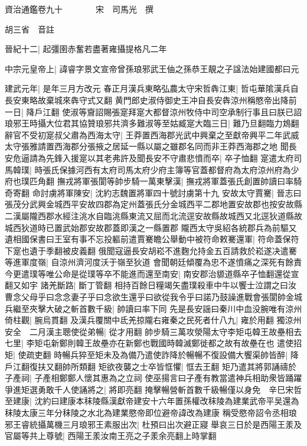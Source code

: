 資治通鑑卷九十　　　　宋　司馬光　撰

胡三省　音註

晉紀十二|{
	起彊圉赤奮若盡著雍攝提格凡二年}


中宗元皇帝上|{
	諱睿字景文宣帝曾孫琅邪武王伷之孫恭王靚之子諡法始建國都曰元}


建武元年|{
	是年三月方改元}
春正月漢兵東略弘農太守宋哲犇江東|{
	哲屯華隂漢兵自長安東略故棄城來犇守式又翻}
黄門郎史淑侍御史王冲自長安犇涼州稱愍帝出降前一日|{
	降戶江翻}
使淑等齎詔賜張寔拜寔大都督涼州牧侍中司空承制行事且曰朕已詔琅邪王時攝大位君其協贊琅邪共濟多難淑等至姑臧寔大臨三日|{
	難乃旦翻臨力鴆翻}
辭官不受初寔叔父肅為西海太守|{
	王莽置西海郡光武中興棄之至獻帝興平二年武威太守張雅請置西海郡分張掖之居延一縣以屬之雖郡名同而非王莽西海郡之地}
聞長安危逼請為先鋒入援寔以其老弗許及聞長安不守肅悲憤而卒|{
	卒子恤翻}
寔遣太府司馬韓璞|{
	時張氏保據河西有太府司馬太府少府主簿等官蓋都督府為太府涼州府為少府也璞匹角翻}
撫戎將軍張閬等帥步騎一萬東擊漢|{
	撫戎將軍蓋張氏創置帥讀曰率騎奇寄翻}
命討虜將軍陳安|{
	沈約志魏置將軍四十號討虜第十九}
安故太守賈騫|{
	晉志曰張茂分武興金城西平安故四郡為定州蓋張氏分金城西平二郡地置安故郡也按安故縣二漢屬隴西郡水經注洮水自臨洮縣東流又屈而北流逕安故縣故城西又北逕狄道縣故城西狄道時已置武始郡安故郡蓋即漢之一縣置郡}
隴西太守吳紹各統郡兵為前驅又遺相國保書曰王室有事不忘投軀前遣賈騫瞻公舉動中被符命敕騫還軍|{
	符命蓋保符下寔也遺于季翻被皮義翻}
俄聞寇逼長安胡崧不進麴允持金五百請救於崧遂决遣騫等進軍度嶺|{
	自涼州濟河度沃于嶺至狄道}
會聞朝廷傾覆為忠不遂憤痛之深死有餘責今更遣璞等唯公命是從璞等卒不能進而還至南安|{
	南安郡治䝠道縣卒子恤翻還從宣翻又如宇}
諸羌斷路|{
	斷丁管翻}
相持百餘日糧竭矢盡璞殺車中牛以饗士泣謂之曰汝曹念父母乎曰念念妻子乎曰念欲生還乎曰欲從我令乎曰諾乃鼓譟進戰會張閬帥金城兵繼至夾擊大破之斬首數千級|{
	帥讀曰率下同}
先是長安謡曰秦川中血没腕唯有涼州倚柱觀|{
	腕烏貫翻}
及漢兵覆關中氐羌掠隴右雍秦之民死者什八九|{
	雍於用翻}
獨涼州安全　二月漢主聰使從弟暢|{
	從才用翻}
帥步騎三萬攻滎陽太守李矩屯韓王故壘相去七里|{
	李矩屯新鄭則韓王故壘亦在新鄭也戰國時韓滅鄭徙都之故有故壘在也}
遣使招矩|{
	使疏吏翻}
時暢兵猝至矩未及為備乃遣使詐降於暢暢不復設備大饗渠帥皆醉|{
	降戶江翻復扶又翻帥所類翻}
矩欲夜襲之士卒皆恇懼|{
	恇去王翻}
矩乃遣其將郭誦禱於子產祠|{
	子產相鄭鄭人懷其惠為之立祠}
使巫揚言曰子產有教當遣神兵相助衆皆踊躍爭進矩選勇敢千人使誦將之|{
	將即亮翻}
掩擊暢營斬首數千級暢僅以身免　辛巳宋哲至建康|{
	沈約曰建康本秣陵縣漢獻帝建安十六年置孫權改秣陵為建業武帝平吴還為秣陵太康三年分秣陵之水北為建業愍帝即位避帝諱改為建康}
稱受愍帝詔令丞相琅邪王睿統攝萬機三月琅邪王素服出次|{
	杜預曰出次避正寢}
舉哀三日於是西陽王羕及官屬等共上尊號|{
	西陽王羕汝南王亮之子羕余亮翻上時掌翻}
